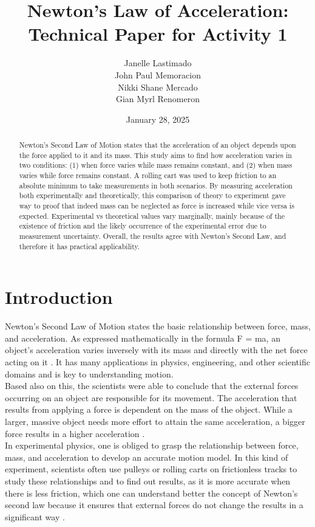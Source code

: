 \documentclass[a4paper,12pt]{article}
\title{Newton's Law of Acceleration: Technical Paper for Activity 1}
\author{Janelle Lastimado \\
John Paul Memoracion \\ 
Nikki Shane Mercado \\
Gian Myrl Renomeron}
\date{January 28, 2025}
\begin{document}
\maketitle

\begin{abstract}
    Newton's Second Law of Motion states that the acceleration of an object depends upon the force applied to it and its mass. This study aims to find how acceleration varies in two conditions: (1) when force varies while mass remains constant, and (2) when mass varies while force remains constant. A rolling cart was used to keep friction to an absolute minimum to take measurements in both scenarios. By measuring acceleration both experimentally and theoretically, this comparison of theory to experiment gave way to proof that indeed mass can be neglected as force is increased while vice versa is expected. Experimental vs theoretical values vary marginally, mainly because of the existence of friction and the likely occurrence of the experimental error due to measurement uncertainty. Overall, the results agree with Newton's Second Law, and therefore it has practical applicability.
\end{abstract}

\section{Introduction}
Newton's Second Law of Motion states the basic relationship between force, mass, and acceleration. As expressed mathematically in the formula F = ma, an object's acceleration varies inversely with its mass and directly with the net force acting on it \cite{halliday2021fundamentals}. It has many applications in physics, engineering, and other scientific domains and is key to understanding motion. \\

Based also on this, the scientists were able to conclude that the external forces occurring on an object are responsible for its movement. The acceleration that results from applying a force is dependent on the mass of the object. While a larger, massive object needs more effort to attain the same acceleration, a bigger force results in a higher acceleration \cite{knight2017physics}. \\

In experimental physics, one is obliged to grasp the relationship between force, mass, and acceleration to develop an accurate motion model. In this kind of experiment, scientists often use pulleys or rolling carts on frictionless tracks to study these relationships and to find out results, as it is more accurate when there is less friction, which one can understand better the concept of Newton's second law because it ensures that external forces do not change the results in a significant way \cite{young2020university}. \\
\end{document}
